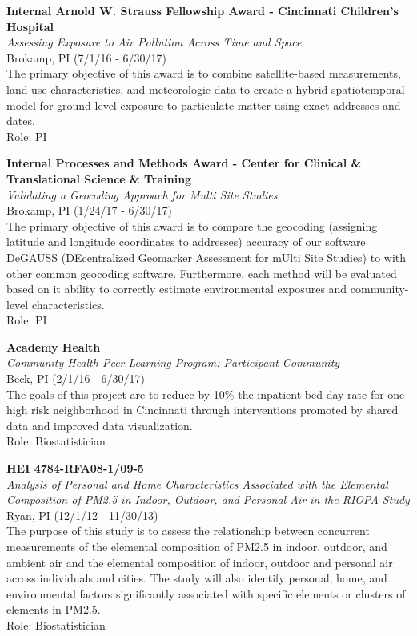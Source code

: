 \documentclass{nihbiosketch}
\begin{document}
\bigskip

\textbf{Internal Arnold W. Strauss Fellowship Award - Cincinnati
	Children's Hospital}\\
\emph{Assessing Exposure to Air Pollution Across Time and Space}\\
Brokamp, PI (7/1/16 - 6/30/17)\\
The primary objective of this award is to combine satellite-based
measurements, land use characteristics, and meteorologic data to create
a hybrid spatiotemporal model for ground level exposure to particulate
matter using exact addresses and dates.\\
Role: PI

\bigskip

\textbf{Internal Processes and Methods Award - Center for Clinical \&
	Translational Science \& Training}\\
\emph{Validating a Geocoding Approach for Multi Site Studies}\\
Brokamp, PI (1/24/17 - 6/30/17)\\
The primary objective of this award is to compare the geocoding
(assigning latitude and longitude coordinates to addresses) accuracy of
our software DeGAUSS (DEcentralized Geomarker Assessment for mUlti Site
Studies) to with other common geocoding software. Furthermore, each
method will be evaluated based on it ability to correctly estimate
environmental exposures and community-level characteristics.\\
Role: PI

\bigskip

\textbf{Academy Health}\\
\emph{Community Health Peer Learning Program: Participant Community}\\
Beck, PI (2/1/16 - 6/30/17)\\
The goals of this project are to reduce by 10\% the inpatient bed-day
rate for one high risk neighborhood in Cincinnati through interventions
promoted by shared data and improved data visualization.\\
Role: Biostatistician

\bigskip

\textbf{HEI 4784-RFA08-1/09-5}\\
\emph{Analysis of Personal and Home Characteristics Associated with the
	Elemental Composition of PM2.5 in Indoor, Outdoor, and Personal Air in
	the RIOPA Study}\\
Ryan, PI (12/1/12 - 11/30/13)\\
The purpose of this study is to assess the relationship between
concurrent measurements of the elemental composition of PM2.5 in indoor,
outdoor, and ambient air and the elemental composition of indoor,
outdoor and personal air across individuals and cities. The study will
also identify personal, home, and environmental factors significantly
associated with specific elements or clusters of elements in PM2.5.\\
Role: Biostatistician
\end{document}
